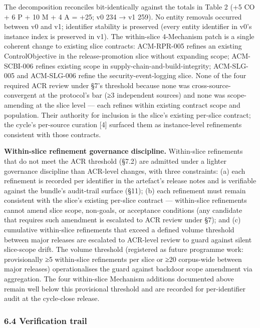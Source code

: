 \documentclass[
]{article}
\begin{document}
The decomposition reconciles bit-identically against the totals in Table
2 (+5 CO + 6 P + 10 M + 4 A = +25; v0 234 → v1 259). No entity removals
occurred between v0 and v1; identifier stability is preserved (every
entity identifier in v0's instance index is preserved in v1). The
within-slice 4-Mechanism patch is a single coherent change to existing
slice contracts: ACM-RPR-005 refines an existing ControlObjective in the
release-promotion slice without expanding scope; ACM-SCBI-006 refines
existing scope in supply-chain-and-build-integrity; ACM-SLG-005 and
ACM-SLG-006 refine the security-event-logging slice. None of the four
required ACR review under §7's threshold because none was
cross-source-convergent at the protocol's bar (≥3 independent sources)
and none was scope-amending at the slice level --- each refines within
existing contract scope and population. Their authority for inclusion is
the slice's existing per-slice contract; the cycle's per-source curation
{[}4{]} surfaced them as instance-level refinements consistent with
those contracts.

\textbf{Within-slice refinement governance discipline.} Within-slice
refinements that do not meet the ACR threshold (§7.2) are admitted under
a lighter governance discipline than ACR-level changes, with three
constraints: (a) each refinement is recorded per identifier in the
artefact's release notes and is verifiable against the bundle's
audit-trail surface (§11); (b) each refinement must remain consistent
with the slice's existing per-slice contract --- within-slice
refinements cannot amend slice scope, non-goals, or acceptance
conditions (any candidate that requires such amendment is escalated to
ACR review under §7); and (c) cumulative within-slice refinements that
exceed a defined volume threshold between major releases are escalated
to ACR-level review to guard against silent slice-scope drift. The
volume threshold (registered as future programme work: provisionally ≥5
within-slice refinements per slice or ≥20 corpus-wide between major
releases) operationalises the guard against backdoor scope amendment via
aggregation. The four within-slice Mechanism additions documented above
remain well below this provisional threshold and are recorded for
per-identifier audit at the cycle-close release.

\subsubsection{6.4 Verification trail}\label{verification-trail}
\end{document}
